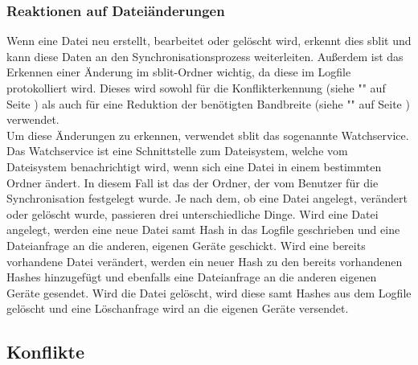 \subsubsection{Reaktionen auf Dateiänderungen}
Wenn eine Datei neu erstellt, bearbeitet oder gelöscht wird, erkennt dies sblit und kann diese Daten an den Synchronisationsprozess weiterleiten. Außerdem ist das Erkennen einer Änderung im sblit-Ordner wichtig, da diese im Logfile protokolliert wird. Dieses wird sowohl für die Konflikterkennung (siehe "" auf Seite \pageref{Konflikterkennung}) als auch für eine Reduktion der benötigten Bandbreite (siehe "" auf Seite \pageref{Dateianfragen}) verwendet.\\
Um diese Änderungen zu erkennen, verwendet sblit das sogenannte Watchservice. Das Watchservice ist eine Schnittstelle zum Dateisystem, welche vom Dateisystem benachrichtigt wird, wenn sich eine Datei in einem bestimmten Ordner ändert. In diesem Fall ist das der Ordner, der vom Benutzer für die Synchronisation festgelegt wurde. Je nach dem, ob eine Datei angelegt, verändert oder gelöscht wurde, passieren drei unterschiedliche Dinge. Wird eine Datei angelegt, werden eine neue Datei samt Hash in das Logfile geschrieben und eine Dateianfrage an die anderen, eigenen Geräte geschickt. Wird eine bereits vorhandene Datei verändert, werden ein neuer Hash zu den bereits vorhandenen Hashes hinzugefügt und ebenfalls eine Dateianfrage an die anderen eigenen Geräte gesendet. Wird die Datei gelöscht, wird diese samt Hashes aus dem Logfile gelöscht und eine Löschanfrage wird an die eigenen Geräte versendet.
 
\subsection{Konflikte}\label{Konflikt}
